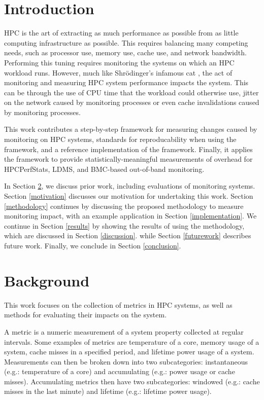 \documentclass[conference]{IEEEtran}
\begin{document}
\section{Introduction} \label{introduction}
HPC is the art of extracting as much performance as possible from as little 
computing infrastructure as possible. This requires balancing many competing 
needs, such as processor use, memory use, cache use, and network bandwidth.
Performing this tuning requires monitoring the systems on which an HPC workload
runs. However, much like Shrödinger's infamous cat
\cite{schroedingerGegenwaertigeSituationQuantenmechanik1935}, the act of 
monitoring and
measuring HPC system performance impacts the system. This can be through the 
use of CPU time that the workload could otherwise use, jitter on the network 
caused by monitoring processes or even cache invalidations caused by
monitoring processes.

This work contributes a step-by-step framework for measuring changes caused by 
monitoring on HPC systems, standards for reproducability when using the 
framework, and a reference implementation of the framework. Finally, it applies 
the framework to provide statistically-meaningful measurements of overhead for 
HPCPerfStats, LDMS, and BMC-based out-of-band monitoring.

In Section \ref{background}, we discuss prior work, including evaluations of monitoring 
systems. Section \ref{motivation} discusses our motivation for undertaking this 
work. Section \ref{methodology} continues by discussing the proposed methodology to measure monitoring 
impact, with an example application in Section \ref{implementation}. We continue in Section \ref{results} by 
showing the results of using the methodology, which are discussed in Section \ref{discussion}.
while Section \ref{futurework} describes future work. Finally, we conclude in Section \ref{conclusion}.

\section{Background} \label{background}

This work focuses on the collection of metrics in HPC systems, as well as 
methods for evaluating their impacts on the system.

A metric is a numeric measurement of a system property collected at regular intervals.
Some examples of
metrics are temperature of a core, memory usage of a system, cache misses in a
specified period, and lifetime power usage of a system. Measurements can
then be broken down into two subcategories: instantaneous (e.g.: temperature of a core) and
accumulating (e.g.: power usage or cache misses). Accumulating metrics then have 
two subcategories: windowed (e.g.: cache misses in the last minute) and 
lifetime (e.g.: lifetime power usage).
\end{document}
